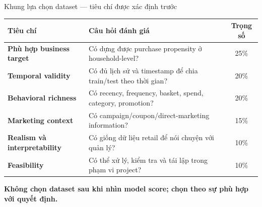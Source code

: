 \documentclass[aspectratio=169,11pt]{beamer}
\begin{document}
\begin{frame}{Khung lựa chọn dataset --- tiêu chí được xác định trước}
  \small
  \begin{tabularx}{\textwidth}{>{\bfseries}p{3.2cm}Xc}
    \toprule
    Tiêu chí & Câu hỏi đánh giá & Trọng số \\
    \midrule
    Phù hợp business target & Có dựng được purchase propensity ở household-level? & 25\% \\
    Temporal validity & Có đủ lịch sử và timestamp để chia train/test theo thời gian? & 20\% \\
    Behavioral richness & Có recency, frequency, basket, spend, category, promotion? & 20\% \\
    Marketing context & Có campaign/coupon/direct-marketing information? & 15\% \\
    Realism và interpretability & Có giống dữ liệu retail để nói chuyện với quản lý? & 10\% \\
    Feasibility & Có thể xử lý, kiểm tra và tái lập trong phạm vi project? & 10\% \\
    \bottomrule
  \end{tabularx}
  \vspace{0.35cm}
  \begin{center}
    \color{Navy}\bfseries Không chọn dataset sau khi nhìn model score;
    chọn theo sự phù hợp với quyết định.
  \end{center}
\end{frame}
\end{document}
